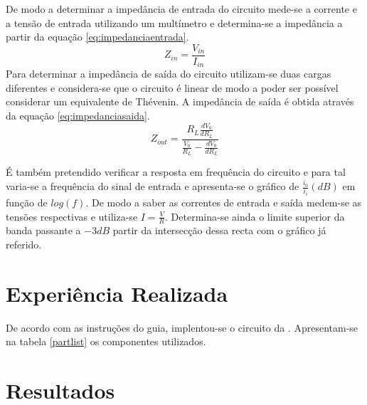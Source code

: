 \documentclass[%
  reprint,
  nofootinbib,
  amsmath,amssymb,
  aps,
  10pt,
  a4paper
]{revtex4-1}
\begin{document}
De modo a determinar a impedância de entrada do circuito mede-se a corrente e a tensão de entrada utilizando um multímetro e determina-se a impedância a partir da equação \ref{eq:impedanciaentrada}.
\begin{equation}
Z_{in}=\frac{V_{in}}{I_{in}}
\label{eq:impedanciaentrada}
\end{equation}
Para determinar a impedância de saída do circuito utilizam-se duas cargas diferentes e considera-se que o circuito é linear de modo a poder ser possível considerar um equivalente de Thévenin. A impedância de saída é obtida através da equação \ref{eq:impedanciasaida}.
\begin{equation}
Z_{out}=\frac{R_L \frac{dV_0}{dR_L}}{\frac{V_0}{R_L}-\frac{dV_0}{dR_L}}
\label{eq:impedanciasaida}
\end{equation}

É também pretendido verificar a resposta em frequência do circuito e para tal varia-se a frequência do sinal de entrada e apresenta-se o gráfico de $\frac{i_0}{i_i} (dB)$ em função de $log(f)$. De modo a saber as correntes de entrada e saída medem-se as tensões respectivas e utiliza-se $I=\frac{V}{R}$. Determina-se ainda o limite superior da banda passante a $-3dB$ partir da intersecção dessa recta com o gráfico já referido. 

\section{Experiência Realizada}
\label{s:expreal}
De acordo com as instruções do guia, implentou-se o circuito da . Apresentam-se na tabela \ref{partlist} os componentes utilizados.





\section{Resultados}
\label{s:resul}
\end{document}
